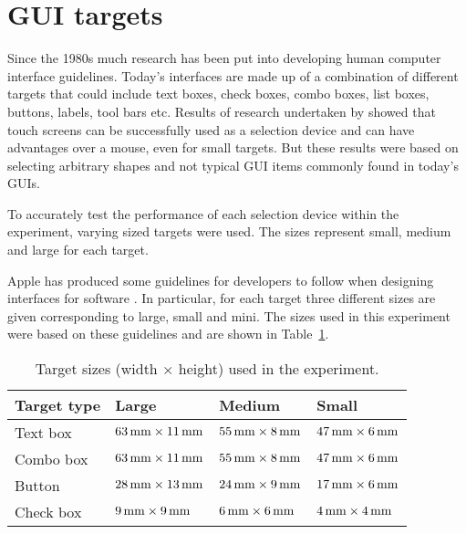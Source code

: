 \documentclass{elsart}
\begin{document}
\section{GUI targets}
\label{sec-GUI}

Since the 1980s much research has been put into developing human
computer interface guidelines. Today's interfaces are made up of a
combination of different targets that could include text boxes, check
boxes, combo boxes, list boxes, buttons, labels, tool bars etc. Results
of research undertaken by \citet{Sear-A-1991-IJMMS} showed that touch
screens can be successfully used as a selection device and can have
advantages over a mouse, even for small targets. But these results were
based on selecting arbitrary shapes and not typical GUI items commonly
found in today's GUIs.

To accurately test the performance of each selection device within the
experiment, varying sized targets were used. The sizes represent small,
medium and large for each target.

Apple has produced some guidelines for developers to follow when
designing interfaces for software \citep{Appl-2004-HIG}. In particular,
for each target three different sizes are given corresponding to large,
small and mini. The sizes used in this experiment were based on these
guidelines and are shown in Table~\ref{tab-target-sizes}.


\begin{table}
	\caption{Target sizes (width \(\times\) height) used in the experiment.}
	\label{tab-target-sizes}
	\begin{tabular}{llll}
		\hline
		\textbf{Target type}	&	\textbf{Large}							&	\textbf{Medium}							&	\textbf{Small}	\\
		\hline
		Text box				&	\(\unit[63]{mm} \times \unit[11]{mm}\)	&	\(\unit[55]{mm} \times \unit[8]{mm}\)	&	\(\unit[47]{mm} \times \unit[6]{mm}\)	\\
		Combo box				&	\(\unit[63]{mm} \times \unit[11]{mm}\)	&	\(\unit[55]{mm} \times \unit[8]{mm}\)	&	\(\unit[47]{mm} \times \unit[6]{mm}\)	\\
		Button					&	\(\unit[28]{mm} \times \unit[13]{mm}\)	&	\(\unit[24]{mm} \times \unit[9]{mm}\)	&	\(\unit[17]{mm} \times \unit[6]{mm}\)	\\
		Check box				&	\(\unit[9]{mm} \times \unit[9]{mm}\)	&	\(\unit[6]{mm} \times \unit[6]{mm}\)	&	\(\unit[4]{mm} \times \unit[4]{mm}\)	\\
		\hline
	\end{tabular}
\end{table}
\end{document}

